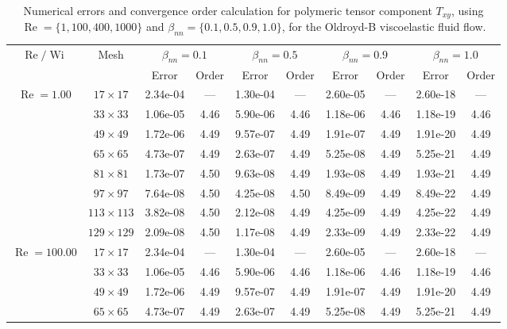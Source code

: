 \documentclass[preprint, 12pt]{elsarticle}
\begin{document}
\begin{center}
\begin{table}[H]
\caption{Numerical errors and convergence order calculation for polymeric tensor component $T_{xy}$, using $\operatorname{Re}=\{1,100,400,1000\}$ and $\beta_{nn}=\{0.1,0.5,0.9,1.0\}$, for the Oldroyd-B viscoelastic fluid flow.\label{Appendix_tab_OldroydBTxyWi5_10}}
\tiny{
    \begin{tabular*}{\textwidth}{@{\extracolsep\fill}cccccccccc@{}}
    \hline
    \multirow{2}{*}{$\operatorname{Re}/\operatorname{Wi}$} & \multirow{2}{*}{Mesh} & \multicolumn{2}{c}{$\beta_{nn}=0.1$}  & \multicolumn{2}{c}{$\beta_{nn}=0.5$}  & \multicolumn{2}{c}{$\beta_{nn}=0.9$}  & \multicolumn{2}{c}{$\beta_{nn}=1.0$}\\ %
     & & Error & Order & Error & Order & Error & Order & Error & Order \\
    \hline
    \multirow{7}{*}{$\operatorname{Re}=1.00$} & $17\times 17$ & 2.34e-04 & --- & 1.30e-04 & --- & 2.60e-05 & --- & 2.60e-18 & --- \\
    & $33\times 33$ & 1.06e-05 & 4.46 & 5.90e-06 & 4.46 & 1.18e-06 & 4.46 & 1.18e-19 & 4.46 \\
    & $49\times 49$ & 1.72e-06 & 4.49 & 9.57e-07 & 4.49 & 1.91e-07 & 4.49 & 1.91e-20 & 4.49 \\
    \multirow{3}{*}{$\operatorname{Wi}=5$} & $65\times 65$ & 4.73e-07 & 4.49 & 2.63e-07 & 4.49 & 5.25e-08 & 4.49 & 5.25e-21 & 4.49 \\
    & $81\times 81$ & 1.73e-07 & 4.50 & 9.63e-08 & 4.49 & 1.93e-08 & 4.49 & 1.93e-21 & 4.49 \\
    & $97\times 97$ & 7.64e-08 & 4.50 & 4.25e-08 & 4.50 & 8.49e-09 & 4.49 & 8.49e-22 & 4.49 \\
    & $113\times 113$ & 3.82e-08 & 4.50 & 2.12e-08 & 4.49 & 4.25e-09 & 4.49 & 4.25e-22 & 4.49 \\
    & $129\times 129$ & 2.09e-08 & 4.50 & 1.17e-08 & 4.49 & 2.33e-09 & 4.49 & 2.33e-22 & 4.49 \\
    \hline
    \multirow{7}{*}{$\operatorname{Re}=100.00$} & $17\times 17$ & 2.34e-04 & --- & 1.30e-04 & --- & 2.60e-05 & --- & 2.60e-18 & --- \\
    & $33\times 33$ & 1.06e-05 & 4.46 & 5.90e-06 & 4.46 & 1.18e-06 & 4.46 & 1.18e-19 & 4.46 \\
    & $49\times 49$ & 1.72e-06 & 4.49 & 9.57e-07 & 4.49 & 1.91e-07 & 4.49 & 1.91e-20 & 4.49 \\
    \multirow{3}{*}{$\operatorname{Wi}=5$} & $65\times 65$ & 4.73e-07 & 4.49 & 2.63e-07 & 4.49 & 5.25e-08 & 4.49 & 5.25e-21 & 4.49 \\

\end{tabular*}}
\end{table}
\end{center}
\end{document}
